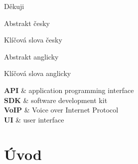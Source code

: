 \documentclass[FM]{tulthesis}
\begin{document}
	
	\begin{acknowledgement}
		Děkuji
	\end{acknowledgement}
	
	\begin{abstractCZ}
		Abstrakt česky
	\end{abstractCZ}
	
	\begin{keywordsCZ}
		Klíčová slova česky
	\end{keywordsCZ}
	\vspace{2cm}
	
	\begin{abstractEN}
		Abstrakt anglicky
	\end{abstractEN}
	
	\begin{keywordsEN}
		Klíčová slova anglicky
	\end{keywordsEN}
	
	\tableofcontents
	
	\listoffigures
	
	
	\clearpage
	
	\begin{abbrList}
		\textbf{API} & application programming interface \\
		\textbf{SDK} & software development kit \\
		\textbf{VoIP} & Voice over Internet Protocol \\
		\textbf{UI} & user interface \\
	\end{abbrList}
	
	
	
	\chapter{Úvod}
	
\end{document}
